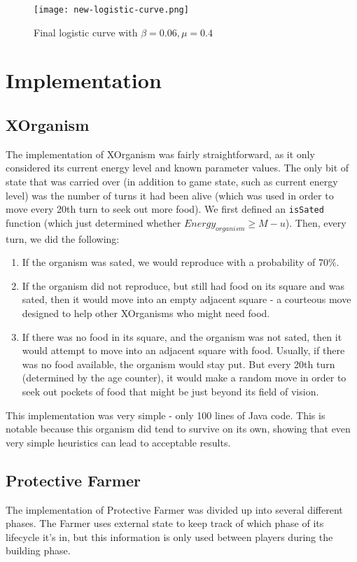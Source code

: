 \documentclass[
10pt, %
letterpaper, %
oneside, %
headinclude,footinclude, %
english
]{article}
\begin{document}
\begin{figure}[h]
\centering
\texttt{[image: new-logistic-curve.png]}
\caption[Final logistic curve with $\beta=0.06,\mu=0.4$]{Final logistic curve with $\beta=0.06,\mu=0.4$}
\label{fig:gallery3}
\end{figure}
\section{Implementation}

\subsection{XOrganism}

The implementation of XOrganism was fairly straightforward, as it only considered its current energy level and known parameter values. The only bit of state that was carried over (in addition to game state, such as current energy level) was the number of turns it had been alive (which was used in order to move every 20th turn to seek out more food). We first defined an \texttt{isSated} function (which just determined whether $Energy_{organism} \geq M - u$). Then, every turn, we did the following:

\begin{enumerate}
  \item If the organism was sated, we would reproduce with a probability of 70\%.
  \item If the organism did not reproduce, but still had food on its square and was sated, then it would move into an empty adjacent square - a courteous move designed to help other XOrganisms who might need food.
  \item If there was no food in its square, and the organism was not sated, then it would attempt to move into an adjacent square with food. Usually, if there was no food available, the organism would stay put. But every 20th turn (determined by the age counter), it would make a random move in order to seek out pockets of food that might be just beyond its field of vision.
\end{enumerate}

This implementation was very simple - only 100 lines of Java code. This is notable because this organism did tend to survive on its own, showing that even very simple heuristics can lead to acceptable results.

\subsection{Protective Farmer}
The implementation of Protective Farmer was divided up into several different phases. The Farmer uses external state to keep track of which phase of its lifecycle it's in, but this information is only used between players during the building phase.
\end{document}
